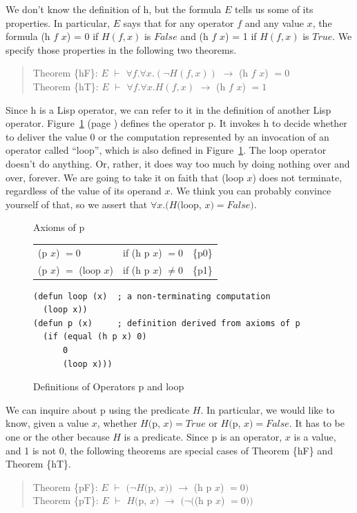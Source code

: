 We don't know the definition of h, but the formula $E$
tells us some of its properties.
In particular, $E$ says that for any operator $f$ and any value $x$,
the formula (h $f$ $x$) = 0 if $H(f, x)$ is $False$ and
(h $f$ $x$) = 1 if $H(f,x)$ is $True$.
We specify those properties in the following two theorems.
\begin{quote}
Theorem \{hF\}: $E$ $\vdash$ $\forall f.\forall x.(\neg H(f, x))$ $\rightarrow$ (h $f$ $x$) $= 0$\\
Theorem \{hT\}: $E$ $\vdash$ $\forall f.\forall x.H(f, x)$      $\rightarrow$ (h $f$ $x$) $= 1$
\end{quote}

Since h is a Lisp operator, we can refer to it in the definition of
another Lisp operator.
Figure~\ref{fig:paradox-op-defun} (page \pageref{fig:paradox-op-defun})
defines the operator p.
It invokes h to decide whether to deliver the value 0 or
the computation represented by an invocation of an operator called ``loop'',
which is also defined in
Figure~\ref{fig:paradox-op-defun}.
The loop operator doesn't do anything.
Or, rather,
it does way too much by doing nothing over and over, forever.
We are going to take it on faith that (loop $x$) does not terminate,
regardless of the value of its operand $x$.
We think you can probably convince yourself of that,
so we assert that $\forall x.(H($loop, $x) = False)$.

\begin{figure}
\begin{center}
Axioms of p\\
\begin{tabular}{lll}
(p $x$) $= 0$          & if (h p $x$) $=  0$      &\{p0\}\\
(p $x$) $=$ (loop $x$) & if (h p $x$) $\neq 0$    &\{p1\}\\
\end{tabular}
\begin{Verbatim}
(defun loop (x)  ; a non-terminating computation
  (loop x))
(defun p (x)     ; definition derived from axioms of p
  (if (equal (h p x) 0)
      0
      (loop x)))
\end{Verbatim}
\end{center}
\caption{Definitions of Operators p and loop}
\label{fig:paradox-op-defun}
\end{figure}

We can inquire about p using the predicate $H$.
In particular, we would like to know, given a value $x$,
whether $H($p, $x)=True$ or $H($p, $x)=False$.
It has to be one or the other because $H$ is a predicate.
Since p is an operator, $x$ is a value, and 1 is not 0,
the following theorems are special cases of
Theorem \{hF\} and Theorem \{hT\}.
\begin{quote}
Theorem \{pF\}: $E$ $\vdash$ $(\neg H($p, $x))$ $\rightarrow$ (h p $x$) $= 0)$ \\
Theorem \{pT\}: $E$ $\vdash$ $H($p, $x)$ $\rightarrow$ $(\neg($(h p $x$) $= 0))$
\end{quote}


